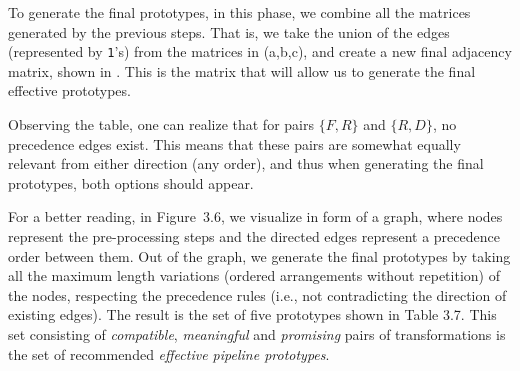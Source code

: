 \begin{example}
To generate the final prototypes, in this phase, we combine all the matrices generated by the previous steps.
That is, we take the union of the edges (represented by \texttt{1}'s) from the matrices in  (a,b,c), and create a new final adjacency matrix, shown in .
This is the matrix that will allow us to generate the final effective prototypes.

Observing the table, one can realize that for pairs $\{F,R\}$ and $\{R,D\}$, no precedence edges exist.
This means that these pairs are somewhat equally relevant from either direction (any order), and thus when generating the final prototypes, both options should appear.

For a better reading, in Figure~3.6, we visualize  in form of a graph, where nodes represent the pre-processing steps and the directed edges represent a precedence order between them.
Out of the graph, we generate the final prototypes by taking all the maximum length variations (ordered arrangements without repetition) of the nodes, respecting the precedence rules (i.e., not contradicting the direction of existing edges).
The result is the set of five prototypes shown in Table 3.7. This set consisting of \textit{compatible}, \textit{meaningful} and \textit{promising} pairs of transformations is the set of recommended \textit{effective pipeline prototypes}.



\end{example}
